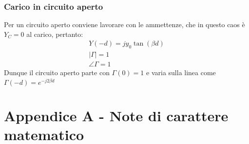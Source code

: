 \documentclass{book}
\begin{document}
    \subsection*{Carico in circuito aperto}
        Per un circuito aperto conviene lavorare con le ammettenze, 
        che in questo caos è $Y_{C}=0$ al carico, pertanto:
        \begin{align}
            Y(-d) = j y_{0}\tan(\beta d) \\
            |\Gamma| = 1 \\
            \angle \Gamma = 1
        \end{align}
        Dunque il circuito aperto parte con $\Gamma(0)=1$ e varia sulla linea come $\Gamma(-d)=e^{-j2 \beta d}$
        \chapter*{Appendice A - Note di carattere matematico}
    
\end{document}
